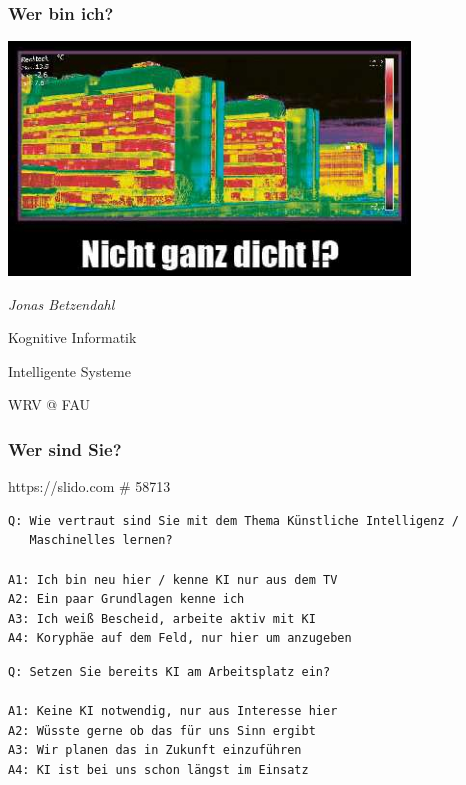 \documentclass[aspectratio=169,xcolor=dvipsnames]{beamer}
\begin{document}
\begin{frame}
\frametitle{Wer bin ich?}
\begin{minipage}{0.6\paperwidth}
\begin{center}
\includegraphics[width=0.8\textwidth,keepaspectratio]{images/thermopostkarte}
\end{center}
\end{minipage}\begin{minipage}{0.25\paperwidth}
\Large
\emph{Jonas Betzendahl}
\normalsize
\bigskip

Kognitive Informatik

Intelligente Systeme
\medskip

WRV @ FAU 
\end{minipage}
\end{frame}

\begin{frame}[fragile]
\frametitle{Wer sind Sie?}
\begin{center}
\large https://slido.com \qquad \# 58713
\end{center}

\scriptsize
\begin{minipage}{\textwidth}
\begin{verbatim}
Q: Wie vertraut sind Sie mit dem Thema Künstliche Intelligenz /
   Maschinelles lernen?

A1: Ich bin neu hier / kenne KI nur aus dem TV
A2: Ein paar Grundlagen kenne ich
A3: Ich weiß Bescheid, arbeite aktiv mit KI
A4: Koryphäe auf dem Feld, nur hier um anzugeben
\end{verbatim}
\end{minipage}
\pause \bigskip\bigskip

\begin{minipage}{\textwidth}
\begin{verbatim}
Q: Setzen Sie bereits KI am Arbeitsplatz ein?

A1: Keine KI notwendig, nur aus Interesse hier
A2: Wüsste gerne ob das für uns Sinn ergibt
A3: Wir planen das in Zukunft einzuführen
A4: KI ist bei uns schon längst im Einsatz
\end{verbatim}
\end{minipage}
\end{frame}
\end{document}
